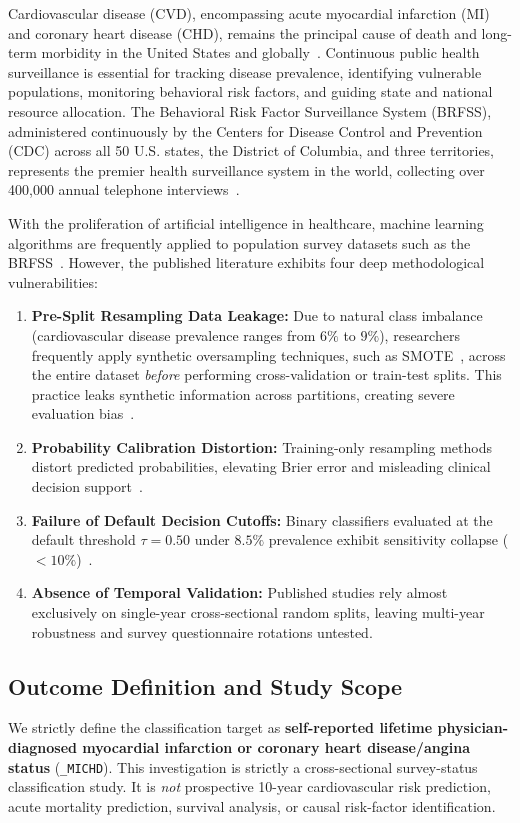 \documentclass[11pt,a4paper]{article}
\begin{document}
Cardiovascular disease (CVD), encompassing acute myocardial infarction (MI) and coronary heart disease (CHD), remains the principal cause of death and long-term morbidity in the United States and globally~\cite{Tsao2023_AHA}. Continuous public health surveillance is essential for tracking disease prevalence, identifying vulnerable populations, monitoring behavioral risk factors, and guiding state and national resource allocation. The Behavioral Risk Factor Surveillance System (BRFSS), administered continuously by the Centers for Disease Control and Prevention (CDC) across all 50 U.S. states, the District of Columbia, and three territories, represents the premier health surveillance system in the world, collecting over 400,000 annual telephone interviews~\cite{CDC_BRFSS_Overview}.

With the proliferation of artificial intelligence in healthcare, machine learning algorithms are frequently applied to population survey datasets such as the BRFSS~\cite{Jahed2023_ICSCA, Aiosa2023_IEEEAccess}. However, the published literature exhibits four deep methodological vulnerabilities:
\begin{enumerate}
    \item \textbf{Pre-Split Resampling Data Leakage:} Due to natural class imbalance (cardiovascular disease prevalence ranges from $6\%$ to $9\%$), researchers frequently apply synthetic oversampling techniques, such as SMOTE~\cite{Chawla2002_JAIR}, across the entire dataset \emph{before} performing cross-validation or train-test splits. This practice leaks synthetic information across partitions, creating severe evaluation bias~\cite{Vandewiele2021_ML, Kapoor2023_Patterns}.
    \item \textbf{Probability Calibration Distortion:} Training-only resampling methods distort predicted probabilities, elevating Brier error and misleading clinical decision support~\cite{VanCalster2019_BMCMed, Steyerberg2010_Epidemiology}.
    \item \textbf{Failure of Default Decision Cutoffs:} Binary classifiers evaluated at the default threshold $\tau = 0.50$ under $8.5\%$ prevalence exhibit sensitivity collapse ($<10\%$)~\cite{Jahed2023_ICSCA}.
    \item \textbf{Absence of Temporal Validation:} Published studies rely almost exclusively on single-year cross-sectional random splits, leaving multi-year robustness and survey questionnaire rotations untested.
\end{enumerate}

\subsection{Outcome Definition and Study Scope}
We strictly define the classification target as \textbf{self-reported lifetime physician-diagnosed myocardial infarction or coronary heart disease/angina status} (\texttt{\_MICHD}). This investigation is strictly a cross-sectional survey-status classification study. It is \emph{not} prospective 10-year cardiovascular risk prediction, acute mortality prediction, survival analysis, or causal risk-factor identification.
\end{document}
